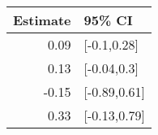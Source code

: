 \begin{tabular}{rl}
  \hline
Estimate & 95\% CI \\ 
  \hline
0.09 & [-0.1,0.28] \\ 
  0.13 & [-0.04,0.3] \\ 
  -0.15 & [-0.89,0.61] \\ 
  0.33 & [-0.13,0.79] \\ 
   \hline
\end{tabular}

